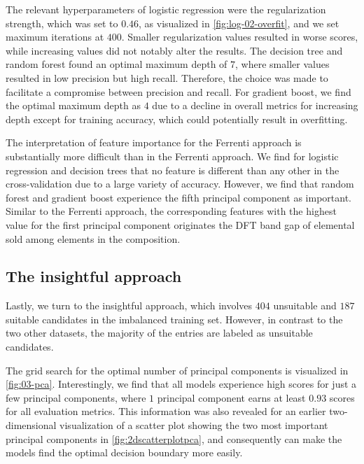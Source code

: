 The relevant hyperparameters of logistic regression were the regularization strength, which was set to $0.46$, as visualized in \autoref{fig:log-02-overfit}, and we set maximum iterations at $400$. Smaller regularization values resulted in worse scores, while increasing values did not notably alter the results. The decision tree and random forest found an optimal maximum depth of $7$, where smaller values resulted in low precision but high recall. Therefore, the choice was made to facilitate a compromise between precision and recall. For gradient boost, we find the optimal maximum depth as $4$ due to a decline in overall metrics for increasing depth except for training accuracy, which could potentially result in overfitting.


The interpretation of feature importance for the Ferrenti approach is substantially more difficult than in the Ferrenti approach. We find for logistic regression and decision trees that no feature is different than any other in the cross-validation due to a large variety of accuracy. However, we find that random forest and gradient boost experience the fifth principal component as important. Similar to the Ferrenti approach, the corresponding features with the highest value for the first principal component originates the DFT band gap of elemental sold among elements in the composition.

\subsection{The insightful approach}

Lastly, we turn to the insightful approach, which involves $404$ unsuitable and $187$ suitable candidates in the imbalanced training set. However, in contrast to the two other datasets, the majority of the entries are labeled as unsuitable candidates.

The grid search for the optimal number of principal components is visualized in \autoref{fig:03-pca}. Interestingly, we find that all models experience high scores for just a few principal components, where $1$ principal component earns at least $0.93$ scores for all evaluation metrics. This information was also revealed for an earlier two-dimensional visualization of a scatter plot showing the two most important principal components in \autoref{fig:2dscatterplotpca}, and consequently can make the models find the optimal decision boundary more easily.

